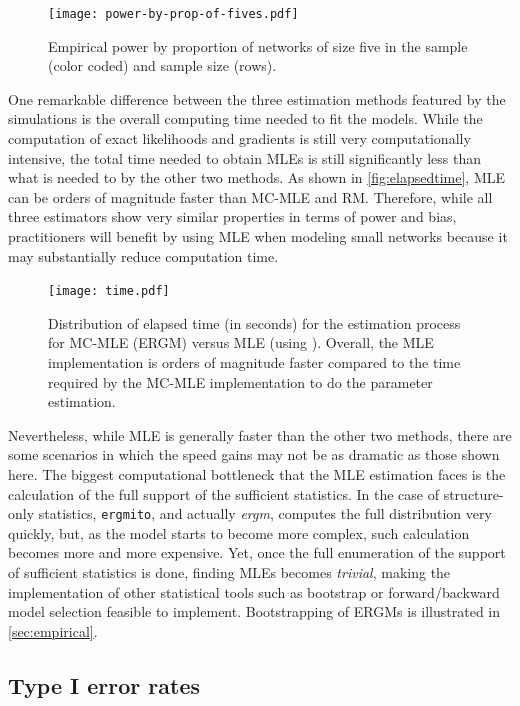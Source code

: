 \documentclass[review, nonatbib,doubleblind]{elsarticle/elsarticle}
\begin{document}
\begin{figure}[tb]
	\centering
	\caption{\label{fig:power-prop5s}Empirical power by proportion of networks of size five in the sample (color coded) and sample size (rows).}
	\texttt{[image: power-by-prop-of-fives.pdf]}
\end{figure}

One remarkable difference between the three estimation methods featured by the simulations is the overall computing time needed to fit the models. While the computation of exact likelihoods and gradients is still very computationally intensive, the total time needed to obtain MLEs is still  significantly less than what is needed to by the other two methods. As shown in \autoref{fig:elapsedtime}, MLE can be orders of magnitude faster than MC-MLE and RM. Therefore, while all three estimators show very similar properties in terms of power and bias, practitioners will benefit by using MLE when modeling small networks because it may substantially reduce computation time.

\begin{figure}[tb]
	\centering
	\caption{\label{fig:elapsedtime}Distribution of elapsed time (in seconds) for the estimation process for MC-MLE (ERGM) versus MLE (using \ergmito{}). Overall, the MLE implementation is orders of magnitude faster compared to the time required by the MC-MLE implementation to do the parameter estimation.}
	\texttt{[image: time.pdf]}
\end{figure}

Nevertheless, while MLE is generally faster than the other two methods, there are some scenarios in which the speed gains may not be as dramatic as those shown here. The biggest computational bottleneck that the MLE estimation faces is the calculation of the full support of the sufficient statistics. In the case of structure-only statistics, \texttt{ergmito}, and actually \textit{ergm}, computes the full distribution very quickly, but, as the model starts to become more complex, such calculation becomes more and more expensive. Yet, once the full enumeration of the support of sufficient statistics is done, finding MLEs becomes \textit{trivial}, making the implementation of other statistical tools such as bootstrap or forward/backward model selection feasible to implement. Bootstrapping of ERGMs is illustrated in \autoref{sec:empirical}.


\subsection{Type I error rates}
\end{document}
